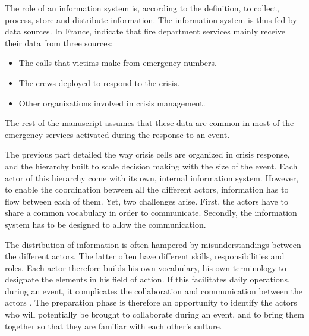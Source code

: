 The role of an information system is, according to the definition, to collect, process, store and distribute information.
The information system is thus fed by data sources.
In France, \cite{morelEtudePriseDecision2010} indicate that fire department services mainly receive their data from three sources:

\begin{itemize}
    \item The calls that victims make from emergency numbers.
    \item The crews deployed to respond to the crisis.
    \item Other organizations involved in crisis management.
\end{itemize}

The rest of the manuscript assumes that these data are common in most of the emergency services activated during the response to an event.

The previous part detailed the way crisis cells are organized in crisis response, and the hierarchy built to scale decision making with the size of the event.
Each actor of this hierarchy come with its own, internal information system.
However, to enable the coordination between all the different actors, information has to flow between each of them.
Yet, two challenges arise.
First, the actors have to share a common vocabulary in order to communicate.
Secondly, the information system has to be designed to allow the communication.

The distribution of information is often hampered by misunderstandings between the different actors.
The latter often have different skills, responsibilities and roles.
Each actor therefore builds his own vocabulary, his own terminology to designate the elements in his field of action.
If this facilitates daily operations, during an event, it complicates the collaboration and communication between the actors \cite{opachMapbasedInterfacesCommon2020}.
The preparation phase is therefore an opportunity to identify the actors who will potentially be brought to collaborate during an event, and to bring them together so that they are familiar with each other's culture.

